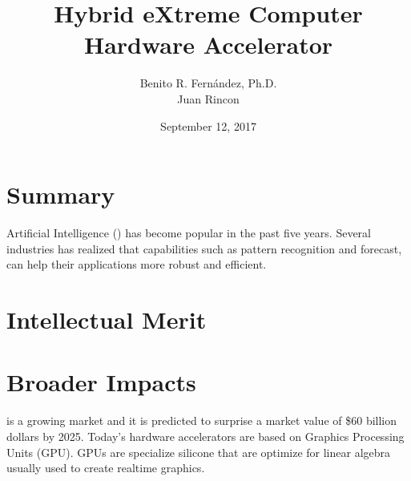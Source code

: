 \documentclass[12pt]{article}
\author{
    Benito R. Fern\'andez, Ph.D.\\
    Juan Rincon
    }
\title{\huge{Hybrid eXtreme Computer \cool{HxC}}\\
Hardware Accelerator}
\date{September 12, 2017}
\begin{document}
	\maketitle
    \section*{Summary}
        Artificial Intelligence () has become popular in the past five years. Several industries has realized that capabilities such as pattern recognition and forecast, can help their applications more robust and efficient. 
    \section*{Intellectual Merit}
    \section*{Broader Impacts}
     is a growing market and it is predicted to surprise a market value of \$60 billion dollars by 2025. %
    Today's hardware accelerators are based on Graphics Processing Units (GPU). GPUs are specialize silicone that are optimize for linear algebra usually used to create realtime graphics. 
    
    
    
            
\end{document}
